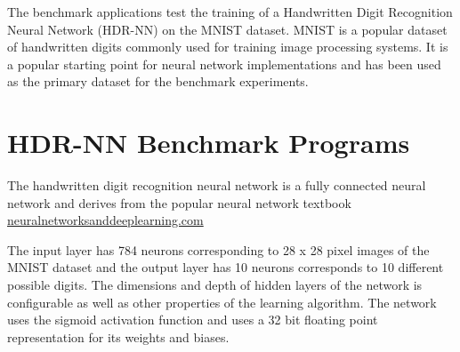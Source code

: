 The benchmark applications test the training of a Handwritten Digit Recognition Neural Network (HDR-NN) on the MNIST \cite{mnist} dataset. MNIST is a popular dataset of handwritten digits commonly used for training image processing systems. It is a popular starting point for neural network implementations and has been used as the primary dataset for the benchmark experiments.

\section[Handwritten Digit Recognition (HDR)]{HDR-NN Benchmark Programs}

The handwritten digit recognition neural network is a fully connected neural network and derives from the popular neural network textbook \href{http://neuralnetworksanddeeplearning.com}{neuralnetworksanddeeplearning.com}

The input layer has 784 neurons corresponding to 28 x 28 pixel images of the MNIST dataset and the output layer has 10 neurons corresponds to 10 different possible digits. The dimensions and depth of hidden layers of the network is configurable as well as other properties of the learning algorithm. The network uses the sigmoid activation function and uses a 32 bit floating point representation for its weights and biases.

